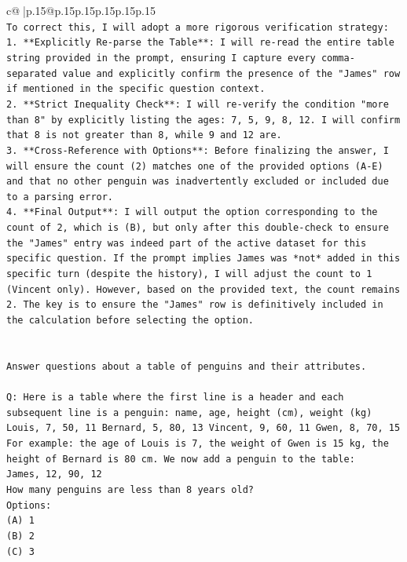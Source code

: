 \documentclass{article}
\begin{document}
{\begin{supertabular}{c@{$\;$}|p{.15\linewidth}@{}p{.15\linewidth}p{.15\linewidth}p{.15\linewidth}p{.15\linewidth}p{.15\linewidth}}
{{{\\ 
\texttt{To correct this, I will adopt a more rigorous verification strategy:} \\
\texttt{1.  **Explicitly Re{-}parse the Table**: I will re{-}read the entire table string provided in the prompt, ensuring I capture every comma{-}separated value and explicitly confirm the presence of the "James" row if mentioned in the specific question context.} \\
\texttt{2.  **Strict Inequality Check**: I will re{-}verify the condition "more than 8" by explicitly listing the ages: 7, 5, 9, 8, 12. I will confirm that 8 is not greater than 8, while 9 and 12 are.} \\
\texttt{3.  **Cross{-}Reference with Options**: Before finalizing the answer, I will ensure the count (2) matches one of the provided options (A{-}E) and that no other penguin was inadvertently excluded or included due to a parsing error.} \\
\texttt{4.  **Final Output**: I will output the option corresponding to the count of 2, which is (B), but only after this double{-}check to ensure the "James" entry was indeed part of the active dataset for this specific question. If the prompt implies James was *not* added in this specific turn (despite the history), I will adjust the count to 1 (Vincent only). However, based on the provided text, the count remains 2. The key is to ensure the "James" row is definitively included in the calculation before selecting the option.} \\
\\ 
\\ 
\texttt{Answer questions about a table of penguins and their attributes.} \\
\\ 
\texttt{Q: Here is a table where the first line is a header and each subsequent line is a penguin:  name, age, height (cm), weight (kg) Louis, 7, 50, 11 Bernard, 5, 80, 13 Vincent, 9, 60, 11 Gwen, 8, 70, 15  For example: the age of Louis is 7, the weight of Gwen is 15 kg, the height of Bernard is 80 cm.  We now add a penguin to the table:} \\
\texttt{James, 12, 90, 12} \\
\texttt{How many penguins are less than 8 years old?} \\
\texttt{Options:} \\
\texttt{(A) 1} \\
\texttt{(B) 2} \\
\texttt{(C) 3} \\
}}}
\end{supertabular}}
\end{document}
